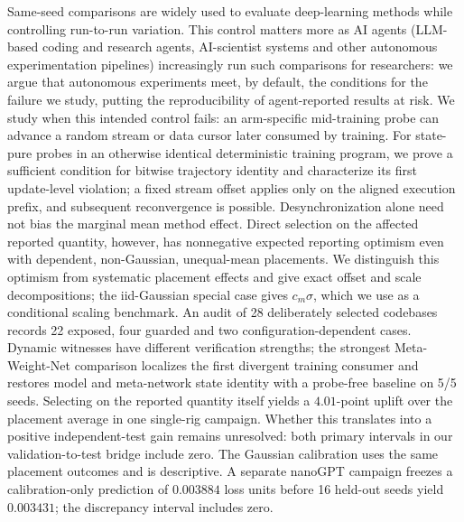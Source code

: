 Same-seed comparisons are widely used to evaluate deep-learning methods while
controlling run-to-run variation. This control matters more as AI agents (LLM-based
coding and research agents, AI-scientist systems and other autonomous
experimentation pipelines) increasingly run such comparisons for researchers:
we argue that autonomous experiments meet, by default, the conditions for the
failure we study, putting the reproducibility of agent-reported results at
risk. We study when this intended control fails: an arm-specific
mid-training probe can advance a random stream or data cursor later consumed
by training. For state-pure probes in an otherwise identical deterministic
training program, we prove a sufficient condition for bitwise trajectory
identity and characterize its first update-level violation; a fixed stream
offset applies only on the aligned execution prefix, and subsequent
reconvergence is possible. Desynchronization alone need not bias the marginal
mean method effect. Direct selection on the affected reported quantity,
however, has nonnegative expected reporting optimism even with dependent,
non-Gaussian, unequal-mean placements. We distinguish this optimism from
systematic placement effects and give exact offset and scale decompositions;
the iid-Gaussian special case gives $c_m\sigma$, which we use as a
conditional scaling benchmark.
An audit of 28 deliberately selected codebases records 22 exposed, four
guarded and two configuration-dependent cases. Dynamic witnesses have
different verification strengths; the strongest Meta-Weight-Net comparison
localizes the first divergent training consumer and restores model and
meta-network state identity with a probe-free baseline on 5/5 seeds.
Selecting on the reported quantity itself yields a $4.01$-point uplift over
the placement average in one single-rig campaign. Whether this translates
into a positive independent-test gain remains unresolved: both primary
intervals in our validation-to-test bridge include zero.
The Gaussian calibration uses the same placement outcomes and is descriptive.
A separate nanoGPT campaign
freezes a calibration-only prediction of $0.003884$ loss units before 16
held-out seeds yield $0.003431$; the discrepancy interval includes zero.
